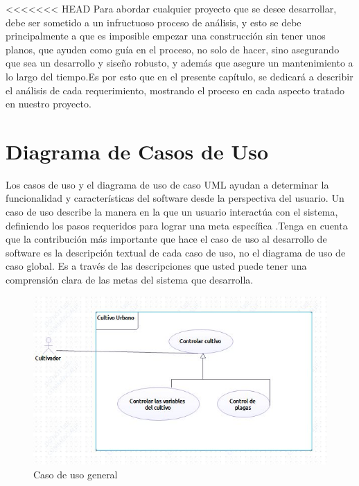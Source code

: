 <<<<<<< HEAD
Para abordar cualquier proyecto que se desee desarrollar, debe ser sometido a un infructuoso proceso de análisis, y esto se debe principalmente a que es imposible empezar una construcción sin tener unos planos, que ayuden como guía en el proceso, no solo de hacer, sino asegurando que sea un desarrollo y siseño robusto, y además que asegure un mantenimiento a lo largo del tiempo.Es por esto que en el presente capítulo, se dedicará a describir el análisis de cada requerimiento, mostrando el proceso en cada aspecto tratado en nuestro proyecto.



\section{Diagrama de Casos de Uso}
Los casos de uso  y el diagrama de uso de caso UML ayudan a determinar la funcionalidad
y características del software desde la perspectiva del usuario. Un caso de uso describe la manera en la que un usuario interactúa con el sistema, definiendo
los pasos requeridos para lograr una meta específica .Tenga en cuenta que la contribución más importante que hace el caso de uso al desarrollo de software es la descripción textual de cada caso de uso, no el diagrama de uso de caso
global. Es a través de las descripciones que usted puede tener una comprensión clara
de las metas del sistema que desarrolla.\cite{pressman1988ingenieria}

\begin{figure}[h!]
	\centering
	\includegraphics[width=0.7\linewidth]{proyecto/imgs/CasoDeUso}
	\caption{Caso de uso general}
	\label{fig:casodeuso}
\end{figure}

